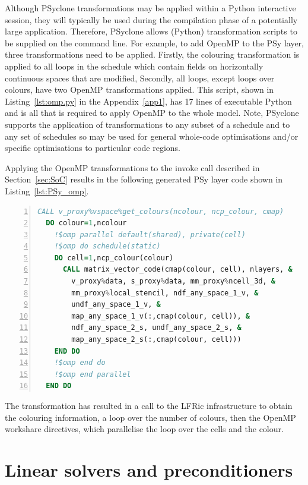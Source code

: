 \documentclass[review,times]{elsarticle}
\begin{document}
Although PSyclone transformations may be applied within a Python
interactive session, they will typically be used during the
compilation phase of a potentially large application. Therefore,
PSyclone allows (Python) transformation scripts to be supplied on the
command line. For example, to add OpenMP to the PSy layer, three
transformations need to be applied. Firstly, the colouring
transformation is applied to all loops in the schedule which contain
fields on horizontally continuous spaces that are modified, Secondly,
all loops, except loops over colours, have two OpenMP transformations
applied. This script, shown in Listing~\ref{lst:omp.py} in the
Appendix~\ref{app1}, has 17 lines of executable Python and is all that is
required to apply OpenMP to the whole model. Note, PSyclone supports
the application of transformations to any subset of a schedule and to
any set of schedules so may be used for general whole-code
optimisations and/or specific optimisations to particular code
regions.

Applying the OpenMP transformations to the invoke call described in
Section~\ref{sec:SoC} results in the following generated PSy layer
code shown in Listing~\ref{lst:PSy_omp}. 
\begin{lstlisting}[language=Fortran, numbers=left,caption={Code 
fragment of the generated PSy layer with OpenMP transformations},label={lst:PSy_omp}]
  CALL v_proxy%vspace%get_colours(ncolour, ncp_colour, cmap)
  DO colour=1,ncolour
    !$omp parallel default(shared), private(cell)
    !$omp do schedule(static)
    DO cell=1,ncp_colour(colour)
      CALL matrix_vector_code(cmap(colour, cell), nlayers, &
        v_proxy%data, s_proxy%data, mm_proxy%ncell_3d, &
        mm_proxy%local_stencil, ndf_any_space_1_v, &
        undf_any_space_1_v, &
        map_any_space_1_v(:,cmap(colour, cell)), &
        ndf_any_space_2_s, undf_any_space_2_s, &
        map_any_space_2_s(:,cmap(colour, cell)))
    END DO
    !$omp end do
    !$omp end parallel
  END DO
\end{lstlisting}
The transformation has resulted in a call to the LFRic infrastructure
to obtain the colouring information, a loop over the number of
colours, then the OpenMP workshare directives, which parallelise the
loop over the cells and the colour.

\section{\label{sec:Solver}Linear solvers and preconditioners}
\end{document}

